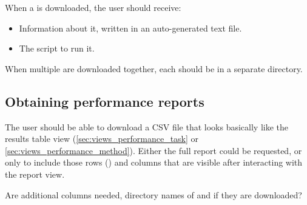 When a \Method is downloaded, the user should receive:
\begin{itemize}
    \item Information about it, written in an auto-generated text file.
    \item The script to run it.
\end{itemize}

When multiple \Methods are downloaded together, each should be in a separate directory.


\subsection{Obtaining performance reports}
\label{sec:downloads_report}

The user should be able to download a CSV file that looks basically like the results table view (\cref{sec:views_performance_task} or \cref{sec:views_performance_method}).
Either the full report could be requested, or only to include those rows (\Elements) and columns that are visible after interacting with the report view.

Are additional columns needed, \eg directory names of \Elements and \Methods if they are downloaded?
